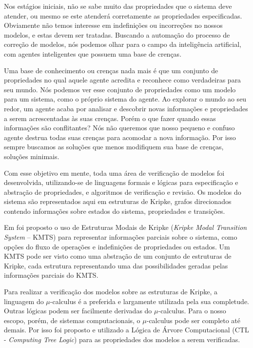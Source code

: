 \documentclass[normaltoc,capchap,capsec,times]{abnt}
\begin{document}
Nos estágios iniciais, não se sabe muito das propriedades que o sistema deve atender, ou mesmo se este atenderá corretamente as propriedades especificadas. Obviamente não temos interesse em indefinições ou incorreções no nossos modelos, e estas devem ser tratadas.
Buscando a automação do processo de correção de modelos, nós podemos olhar para o campo da inteligência artificial, com agentes inteligentes que possuem uma base de crenças.

Uma base de conhecimento ou crenças nada mais é que um conjunto de propriedades no qual aquele agente acredita e reconhece como verdadeiras para seu mundo. Nós podemos ver esse conjunto de propriedades como um modelo para um sistema, como o próprio sistema do agente. Ao explorar o mundo ao seu redor, um agente acaba por analisar e descobrir novas informações e propriedades a serem acrescentadas às suas crenças. Porém o que fazer quando essas informações são conflitantes? Nós não queremos que nosso pequeno e confuso agente destrua todas suas crenças para acomodar a nova informação. Por isso sempre buscamos as soluções que menos modifiquem sua base de crenças, soluções minimais.

Com esse objetivo em mente, toda uma área de verificação de modelos foi desenvolvida, utilizando-se de linguagens formais e lógicas para especificação e abstração de propriedades, e algoritmos de verificação e revisão. Os modelos do sistema são representados aqui em estruturas de Kripke, grafos direcionados contendo informações sobre estados do sistema, propriedades e transições.

Em \cite{aline} foi proposto o uso de Estruturas Modais de Kripke (\textit{Kripke Modal Transition System} -- KMTS) para representar informações parciais sobre o sistema, como opções do fluxo de operações e indefinições de propriedades ou estados. Um KMTS pode ser visto como uma abstração de um conjunto de estruturas de Kripke, cada estrutura representando uma das possibilidades geradas pelas informações parciais do KMTS.

Para realizar a verificação dos modelos sobre as estruturas de Kripke, a linguagem do $\mu$-calculus é a preferida e largamente utilizada pela sua completude. Outras lógicas podem ser facilmente derivadas do $\mu$-calculus. Para o nosso escopo, porém, de sistemas computacionais, o $\mu$-calculus pode ser completo até demais. Por isso foi proposto e utilizado a Lógica de Árvore Computacional (CTL - \textit{Computing Tree Logic}) para as propriedades dos modelos a serem verificadas.
\end{document}
